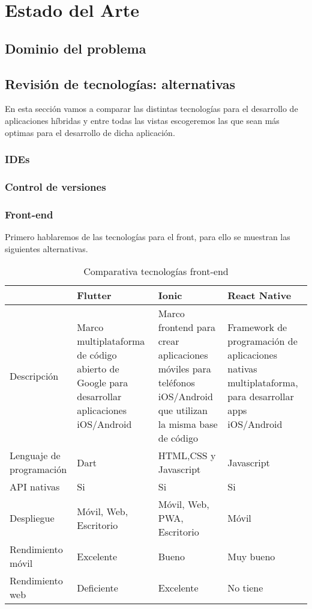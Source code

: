 \section{Estado del Arte}

\subsection{Dominio del problema}

\subsection{Revisión de tecnologías: alternativas}
En esta sección vamos a comparar las distintas tecnologías para el desarrollo de aplicaciones híbridas y entre todas las vistas escogeremos las que sean más optimas para el desarrollo de dicha aplicación.

\subsubsection{IDEs}
\subsubsection{Control de versiones}
\subsubsection{Front-end}
Primero hablaremos de las tecnologías para el front, para ello se muestran las siguientes alternativas.

\begin{table}[H] %
    \centering
    \begin{tabular}{|p{2cm} |p{4 cm} |p{4cm} |p{4cm} |} \hline 
         &  \textbf{Flutter}&  \textbf{Ionic}& \textbf{React Native}\\  \hline 
         Descripción &  Marco multiplataforma de código abierto de Google para desarrollar aplicaciones iOS/Android &  Marco frontend para crear aplicaciones móviles para teléfonos iOS/Android que utilizan la misma base de código& Framework de programación de aplicaciones nativas multiplataforma, para desarrollar apps iOS/Android\\ \hline 
         
        Lenguaje de programación &  Dart&  HTML,CSS y Javascript & Javascript\\ \hline 
        API nativas &  Si&  Si & Si\\ \hline 
        Despliegue &  Móvil, Web, Escritorio&  Móvil, Web, PWA, Escritorio & Móvil\\ \hline 
        Rendimiento móvil &  Excelente &  Bueno & Muy bueno\\ \hline 
        Rendimiento web &  Deficiente &  Excelente & No tiene\\ \hline 
    \end{tabular}
    \caption{Comparativa tecnologías front-end}
    \label{tab:tec_front}
\end{table}

